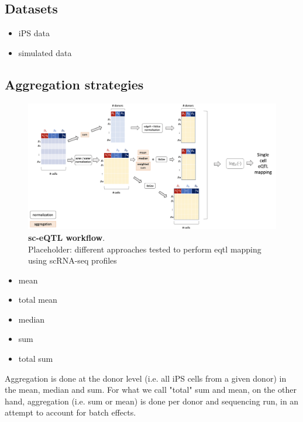 \subsection{Datasets}

\begin{itemize}
    \item iPS data
    \item simulated data
\end{itemize}

\subsection{Aggregation strategies}


\begin{figure}[h]
\centering
\includegraphics[width=15cm]{Chapter3/Fig/sc_qtl_workflow.png}
\caption[sc-eQTL workflow]{\textbf{sc-eQTL workflow}.\\
Placeholder: different approaches tested to perform \gls{eqtl} mapping using scRNA-seq profiles}
\label{fig:sc_qtl_workflow}
\end{figure}

\begin{itemize}
    \item mean
    \item total mean
    \item median
    \item sum
    \item total sum
\end{itemize}

Aggregation is done at the donor level (i.e. all iPS cells from a given donor) in the mean, median and sum.
For what we call "total" sum and mean, on the other hand, aggregation (i.e. sum or mean) is done per donor and sequencing run, in an attempt to account for batch effects.


